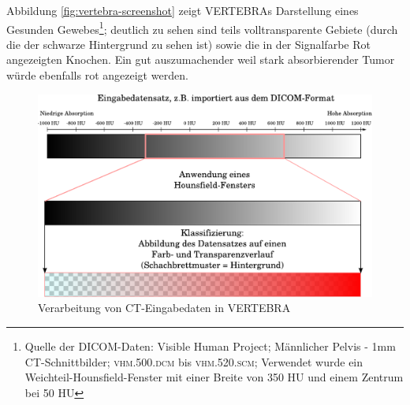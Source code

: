 \documentclass[pdftex,a4paper,titlepage,12pt]{scrartcl}
\newtheorem[L]{boxedDefinition}{Definition}
\begin{document}
Abbildung \vref{fig:vertebra-screenshot} zeigt VERTEBRAs Darstellung eines Gesunden Gewebes\footnote{Quelle der DICOM-Daten: Visible Human Project; Männlicher Pelvis - 1mm CT-Schnittbilder; \textsc{vhm.500.dcm} bis \textsc{vhm.520.scm}; Verwendet wurde ein Weichteil-Hounsfield-Fenster mit einer Breite von 350 HU und einem Zentrum bei 50 HU}; deutlich zu sehen sind teils volltransparente Gebiete (durch die der schwarze Hintergrund zu sehen ist) sowie die in der Signalfarbe Rot angezeigten Knochen. Ein gut auszumachender weil stark absorbierender Tumor würde ebenfalls rot angezeigt werden.

\begin{figure}[p]
\begin{center}
\includegraphics[width=\textwidth]{graphics/Classification.pdf}
\caption{Verarbeitung von CT-Eingabedaten in VERTEBRA}
\label{fig:gradientmapping-graphic}
\end{center}
\end{figure}\label{ssec:implementations}
\end{document}
